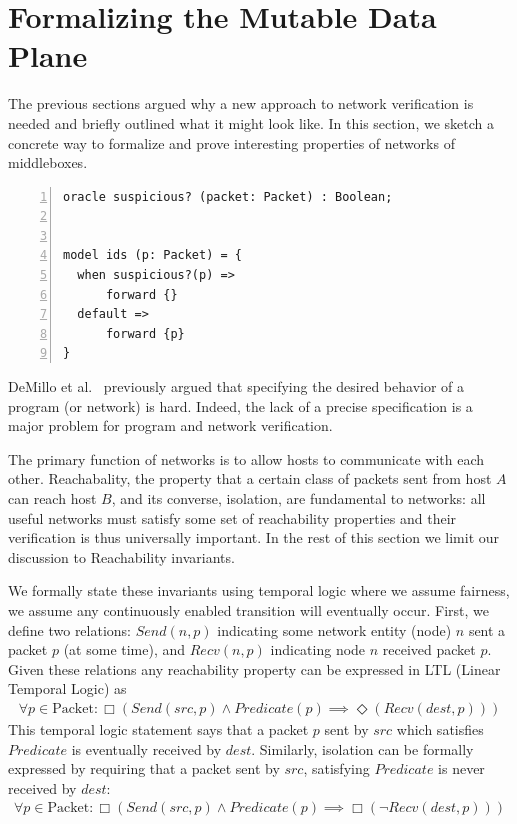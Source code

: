 \section{Formalizing the Mutable Data Plane}
\label{sec:formal}
The previous sections argued why a new approach to network verification is needed and briefly outlined what it might look like.
In this section, we sketch a concrete way to formalize and prove interesting  properties of networks of middleboxes.

\begin{lstlisting}[caption={Model for an IDS},label=list:ids,captionpos=t,float,abovecaptionskip=-\medskipamount,
                    numbers=left,
                    morekeywords={oracle, model, when, default, state, forward},belowskip=-0.1in]
oracle suspicious? (packet: Packet) : Boolean;


model ids (p: Packet) = {
  when suspicious?(p) =>
      forward {}
  default =>
      forward {p}
}
\end{lstlisting}

DeMillo et al.~\cite{popl:DeMilloLP77} previously argued that specifying the desired behavior of a program (or network) is hard. 
Indeed, the lack of a precise specification is a major problem for program and network verification. 

The primary function of networks is to allow hosts to communicate with each other. Reachabality, the property that a certain class of packets sent from host $A$ can reach host $B$, and its converse, isolation, are fundamental to networks: all useful networks must satisfy some set of reachability properties and their verification is thus universally important. In the rest of this section we limit our discussion to Reachability invariants.

We formally state these invariants using temporal logic where we assume fairness, \ie we assume any continuously enabled transition will eventually occur. 
First, we define two relations: $Send(n, p)$ indicating some network entity (node) $n$ sent
a packet $p$ (at some time), and $Recv(n, p)$ indicating node $n$ received packet $p$. Given these relations any reachability property can be expressed in
LTL (Linear Temporal Logic) as
\begin{align*}
\forall p\in \text{Packet}: \Box (Send(src, p) \land Predicate(p) \implies \Diamond(Recv(dest, p)))
\end{align*}
This temporal logic statement says that a packet $p$ sent by $src$ which satisfies $Predicate$ is eventually received by $dest$.
Similarly, isolation can be formally expressed by requiring that a packet sent by $src$, satisfying $Predicate$ is never received by $dest$:
\begin{align*}
\forall p\in \text{Packet}: \Box (Send(src, p) \land Predicate(p) \implies \Box(\neg Recv(dest, p)))
\end{align*}

